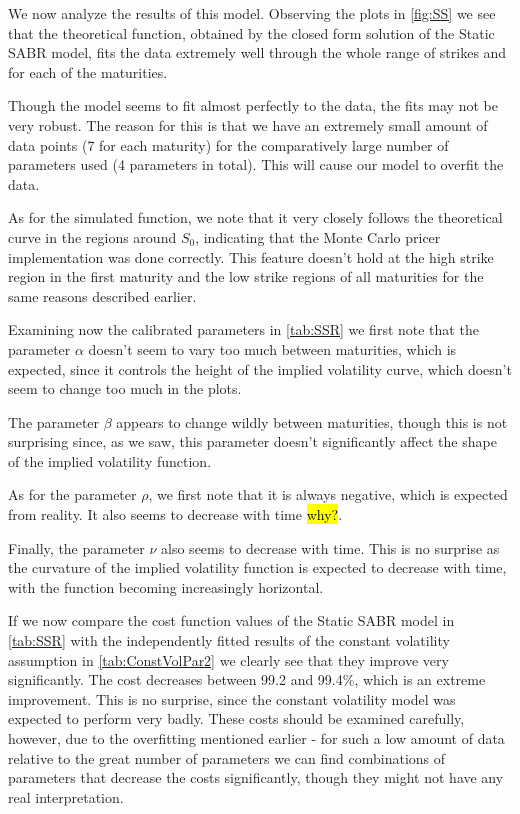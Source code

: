We now analyze the results of this model. Observing the plots in \autoref{fig:SS} we see that the theoretical function, obtained by the closed form solution of the Static SABR model, fits the data extremely well through the whole range of strikes and for each of the maturities.

Though the model seems to fit almost perfectly to the data, the fits may not be very robust. The reason for this is that we have an extremely small amount of data points (7 for each maturity) for the comparatively large number of parameters used (4 parameters in total). This will cause our model to overfit the data.

As for the simulated function, we note that it very closely follows the theoretical curve in the regions around $S_0$, indicating that the Monte Carlo pricer implementation was done correctly. This feature doesn't hold at the high strike region in the first maturity and the low strike regions of all maturities for the same reasons described earlier.

Examining now the calibrated parameters in \autoref{tab:SSR} we first note that the parameter $\alpha$ doesn't seem to vary too much between maturities, which is expected, since it controls the height of the implied volatility curve, which doesn't seem to change too much in the plots.

The parameter $\beta$ appears to change wildly between maturities, though this is not surprising since, as we saw, this parameter doesn't significantly affect the shape of the implied volatility function.

As for the parameter $\rho$, we first note that it is always negative, which is expected from reality. It also seems to decrease with time \hl{why?}.

Finally, the parameter $\nu$ also seems to decrease with time. This is no surprise as the curvature of the implied volatility function is expected to decrease with time, with the function becoming increasingly horizontal.


If we now compare the cost function values of the Static SABR model in \autoref{tab:SSR} with the independently fitted results of the constant volatility assumption in \autoref{tab:ConstVolPar2} we clearly see that they improve very significantly. The cost decreases between 99.2 and 99.4\%, which is an extreme improvement. This is no surprise, since the constant volatility model was expected to perform very badly. These costs should be examined carefully, however, due to the overfitting mentioned earlier - for such a low amount of data relative to the great number of parameters we can find combinations of parameters that decrease the costs significantly, though they might not have any real interpretation.

